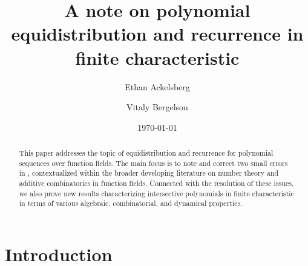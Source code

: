 \documentclass[11pt]{amsart}
\title{A note on polynomial equidistribution and recurrence in finite characteristic}
\author{Ethan Ackelsberg}
\author{Vitaly Bergelson}
\date{\today}
\theoremstyle{theorem}
\theoremstyle{definition}
\begin{document}
\maketitle

\begin{abstract}
    This paper addresses the topic of equidistribution and recurrence for polynomial sequences over function fields.
	The main focus is to note and correct two small errors in \cite{bl}, contextualized within the broader developing literature on number theory and additive combinatorics in function fields.
    Connected with the resolution of these issues, we also prove new results characterizing intersective polynomials in finite characteristic in terms of various algebraic, combinatorial, and dynamical properties.
\end{abstract}


\section{Introduction}
\end{document}
